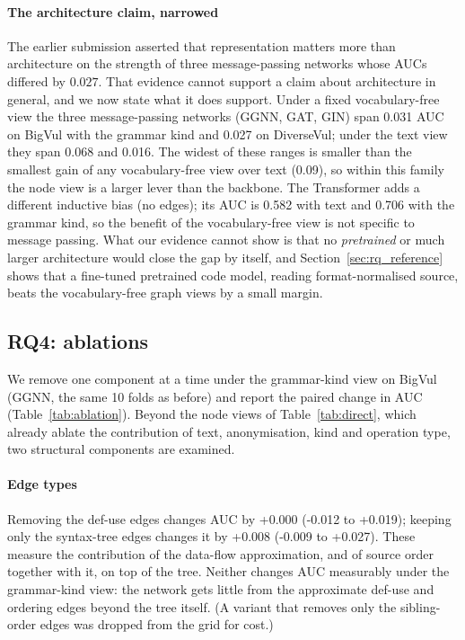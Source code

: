 \documentclass[pdflatex,sn-basic]{sn-jnl}
\theoremstyle{thmstyleone}%
\newcommand{\mBvTfKindAuc}{0.706}
\newcommand{\mBvTfLexAuc}{0.582}
\newcommand{\numbvSpreadKind}{0.031}
\newcommand{\numbvSpreadLex}{0.068}
\newcommand{\numdeltaMin}{0.09}
\newcommand{\numdvSpreadKind}{0.027}
\newcommand{\numdvSpreadLex}{0.016}
\newcommand{\numedgeAstOnlyDiff}{+0.008}
\newcommand{\numedgeAstOnlyHi}{+0.027}
\newcommand{\numedgeAstOnlyLo}{-0.009}
\newcommand{\numedgeNoDuDiff}{+0.000}
\newcommand{\numedgeNoDuHi}{+0.019}
\newcommand{\numedgeNoDuLo}{-0.012}
\begin{document}
\paragraph{The architecture claim, narrowed} The earlier submission asserted
that representation matters more than architecture on the strength of three
message-passing networks whose AUCs differed by $0.027$. That evidence cannot
support a claim about architecture in general, and we now state what it does
support. Under a fixed vocabulary-free view the three message-passing
networks (GGNN, GAT, GIN) span \numbvSpreadKind{} AUC on BigVul with the
grammar kind and \numdvSpreadKind{} on DiverseVul; under the text view they
span \numbvSpreadLex{} and \numdvSpreadLex{}. The widest of these ranges is
smaller than the smallest gain of any vocabulary-free view over text
(\numdeltaMin{}), so within this family the node view is a larger lever than
the backbone. The Transformer adds a different inductive bias (no edges); its
AUC is \mBvTfLexAuc{} with text and \mBvTfKindAuc{} with the grammar kind, so
the benefit of the vocabulary-free view is not specific to message passing.
What our evidence cannot show is that no \emph{pretrained} or much larger
architecture would close the gap by itself, and Section~\ref{sec:rq_reference}
shows that a fine-tuned pretrained code model, reading format-normalised source,
beats the vocabulary-free graph views by a small margin.


\subsection{RQ4: ablations}
\label{sec:rq_ablation}

We remove one component at a time under the grammar-kind view on BigVul (GGNN,
the same 10 folds as before) and report the paired change in AUC
(Table~\ref{tab:ablation}). Beyond the node views of Table~\ref{tab:direct},
which already ablate the contribution of text, anonymisation, kind and
operation type, two structural components are examined.

\paragraph{Edge types} Removing the def-use edges changes AUC by
\numedgeNoDuDiff{} (\numedgeNoDuLo{} to \numedgeNoDuHi{}); keeping only the
syntax-tree edges changes it by \numedgeAstOnlyDiff{} (\numedgeAstOnlyLo{} to
\numedgeAstOnlyHi{}). These measure the contribution of the data-flow
approximation, and of source order together with it, on top of the tree.
Neither changes AUC measurably under the grammar-kind view: the network gets
little from the approximate def-use and ordering edges beyond the tree itself. (A
variant that removes only the sibling-order edges was dropped from the grid
for cost.)
\end{document}
